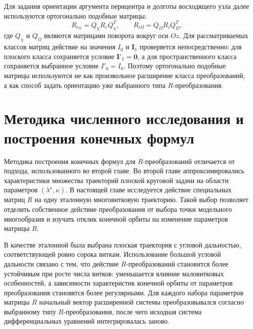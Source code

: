 Для задания ориентации аргумента перицентра и долготы восходящего узла далее используются ортогонально подобные матрицы:
\begin{equation}
R_{e\omega}=Q_\chi R_e Q_\chi^T,
\qquad
R_{i\Omega}=Q_\Omega R_i Q_\Omega^T,
\end{equation}
где \(Q_\chi\) и \(Q_\Omega\) являются матрицами поворота вокруг оси \(Oz\). Для рассматриваемых классов матриц действие на значения \(I_0\) и \(\mathbf I_1\) проверяется непосредственно: для плоского класса сохраняется условие \(\mathbf I'_1=\mathbf 0\), а для пространственного класса сохраняется выбранное условие \(I'_0=I_0\). Поэтому ортогонально подобные матрицы используются не как произвольное расширение класса преобразований, а как способ задать ориентацию уже выбранного типа \(R\)-преобразования.

\section{Методика численного исследования и построения конечных формул}

Методика построения конечных формул для \(R\)-преобразований отличается от подхода, использованного во второй главе. Во второй главе аппроксимировались характеристики множества траекторий плоской круговой задачи на области параметров \((\lambda^\star,\kappa)\). В настоящей главе исследуется действие специальных матриц \(R\) на одну эталонную многовитковую траекторию. Такой выбор позволяет отделить собственное действие преобразования от выбора точки модельного многообразия и изучать отклик конечной орбиты на изменение параметров матрицы \(R\).

В качестве эталонной была выбрана плоская траектория с угловой дальностью, соответствующей ровно сорока виткам. Использование большой угловой дальности связано с тем, что действие \(R\)-преобразований становится более устойчивым при росте числа витков: уменьшается влияние маловитковых особенностей, а зависимости характеристик конечной орбиты от параметров преобразования становятся более регулярными. Для каждого набора параметров матрицы \(R\) начальный вектор расширенной системы преобразовывался согласно выбранному типу \(R\)-преобразования, после чего исходная система дифференциальных уравнений интегрировалась заново.

